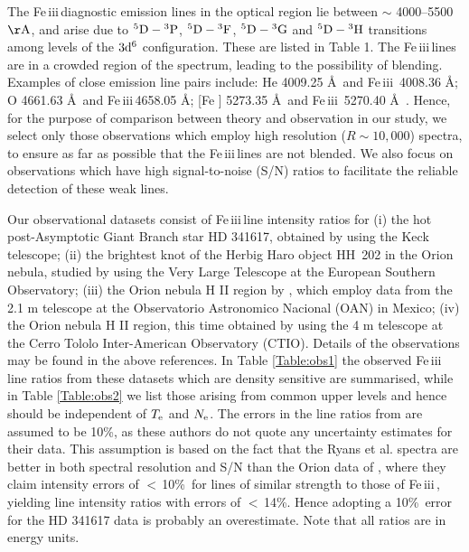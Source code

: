 \documentclass{emulateapj}
\newcommand\fe{Fe\,{\sc iii}\,}
\begin{document}
The \fe diagnostic emission lines in the optical region lie between $\sim$ 4000--5500 $\rm \AA$, and arise due to 
$\rm ^5D - {^3P}$, $\rm ^5D - {^3F}$, $\rm ^5D - {^3G}$ and $\rm ^5D - {^3H}$ transitions among levels of 
the $\rm 3d^6$ configuration. These are listed in Table 1. The \fe lines are in a crowded region of the spectrum,
 leading to the possibility of blending. Examples of close emission line pairs include: He {} 4009.25 \AA\ and \fe 
 4008.36 \AA; O {} 4661.63 \AA\ and \fe  4658.05 \AA; [Fe {}]  5273.35 \AA\ and \fe  
 5270.40 \AA\ \citep[see for example,][]{2002A&A...389..556R,2000ApJS..129..229B}. Hence, for the purpose of comparison between theory and observation in our study, we select only those observations which employ high resolution ($R \sim 10,000$) spectra, to
 ensure as far as possible that the \fe lines are not blended. We also focus on observations which have high signal-to-noise (S/N) ratios to facilitate the reliable detection of these weak lines. 

Our observational datasets consist of \fe line intensity ratios for (i) the hot post-Asymptotic Giant Branch star HD 341617, obtained by \citet{2003A&A...401.1119R} using the Keck telescope; (ii) the brightest knot of the Herbig Haro object HH~202 in the Orion nebula, studied by \citet{2009MNRAS.395..855M} using the Very Large Telescope at the European Southern Observatory; (iii) the Orion nebula H II region 
 by \citet{1998MNRAS.295..401E}, which employ data from the 2.1 m telescope at the Observatorio Astronomico Nacional (OAN) in Mexico;
 (iv) the Orion nebula H II region, this time obtained by \citet{2000ApJS..129..229B} using the 4 m telescope at the Cerro Tololo Inter-American Observatory (CTIO). Details of the observations may be found in the above references. In Table \ref{Table:obs1} the observed \fe line ratios from these datasets which are
density sensitive are summarised, while in Table \ref{Table:obs2} we list those arising from common upper levels and hence should be 
independent of $T_{\rm e}$ and $N_{\rm e}$. The errors in the line ratios from \citet{2003A&A...401.1119R} are assumed to be 10\%, as these authors 
do not quote any uncertainty estimates for their data. {This assumption is based on the fact that the Ryans et al. 
spectra are better in both spectral resolution and S/N than the Orion data of \citet{1998MNRAS.295..401E}, where they claim intensity errors of $<$\,10\%\ for lines of similar strength to those of \fe, yielding line intensity ratios with errors of $<$\,14\%. Hence adopting a 
10\%\ error for the HD 341617 data is probably an overestimate.}  
Note that all ratios are in energy units.
\end{document}

